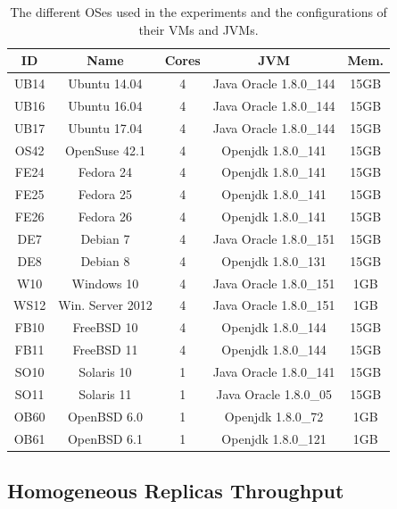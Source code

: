 \begin{table}[t]
\begin{center}
{\footnotesize
\begin{tabular}{| c | c | c | c | c |}\hline
\textbf{ID} & \textbf{Name}  & \textbf{Cores} & \textbf{JVM} & \textbf{Mem.} \\\hline\hline
UB14 & Ubuntu 14.04 & 4 & Java Oracle 1.8.0\_144 & 15GB \\ \hline
UB16 & Ubuntu 16.04 & 4 & Java Oracle 1.8.0\_144 & 15GB \\ \hline
UB17 & Ubuntu 17.04 & 4 & Java Oracle 1.8.0\_144 & 15GB \\ \hline
OS42 & OpenSuse 42.1 & 4 & Openjdk 1.8.0\_141 & 15GB \\ \hline
FE24 & Fedora 24 & 4 & Openjdk 1.8.0\_141 & 15GB \\ \hline
FE25 & Fedora 25 & 4 & Openjdk 1.8.0\_141 & 15GB \\ \hline
FE26 & Fedora 26 & 4 & Openjdk 1.8.0\_141 & 15GB \\ \hline
DE7 & Debian 7 & 4 & Java Oracle 1.8.0\_151 & 15GB \\ \hline
DE8 & Debian 8 & 4 & Openjdk 1.8.0\_131 & 15GB \\ \hline
W10 & Windows 10 & 4 & Java Oracle 1.8.0\_151 &1GB \\ \hline
WS12 & Win. Server 2012 & 4 & Java Oracle 1.8.0\_151 & 1GB \\ \hline
FB10 & FreeBSD 10 & 4 & Openjdk 1.8.0\_144 & 15GB \\ \hline
FB11 & FreeBSD 11 & 4 & Openjdk 1.8.0\_144 & 15GB \\ \hline
SO10 & Solaris 10 & 1 & Java Oracle 1.8.0\_141 & 15GB \\ \hline
SO11 & Solaris 11 & 1 & Java Oracle 1.8.0\_05 & 15GB \\ \hline
OB60 & OpenBSD 6.0 & 1 & Openjdk 1.8.0\_72 & 1GB \\ \hline
OB61 & OpenBSD 6.1 & 1 & Openjdk 1.8.0\_121 & 1GB \\ \hline
\end{tabular}
}
\caption{The different OSes used in the experiments and the configurations of their VMs and JVMs.}
\label{tab:oses}
\end{center}
\end{table}


\subsection{Homogeneous Replicas Throughput}

